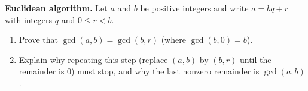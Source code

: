 \textbf{Euclidean algorithm.} Let $a$ and $b$ be positive integers and write $a=bq+r$ with integers $q$ and $0\le r<b$.
\begin{enumerate}
\item[(a)] Prove that $\gcd(a,b)=\gcd(b,r)$ (where $\gcd(b,0)=b$).
\item[(b)] Explain why repeating this step (replace $(a,b)$ by $(b,r)$ until the remainder is $0$) must stop, and why the last nonzero remainder is $\gcd(a,b)$.
\end{enumerate}
